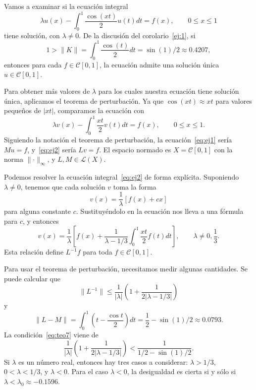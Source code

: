 \begin{ejemplo}
	Vamos a examinar si la ecuación integral
	\begin{equation}\label{eq:ej1}
		\lambda u(x) - \int_{0}^{1} \dfrac{\cos(xt)}{2}u(t)dt = f(x), \qquad 0 \leqslant x \leqslant 1
	\end{equation}
	tiene solución, con $\lambda \neq 0$. De la discusión del corolario~\eqref{ej:1}, si
	\begin{equation}\label{ej:2}
	1 > \lVert K \rVert = \int_{0}^{1}\dfrac{\cos(t)}{2}dt = \sin (1)/2 \approx 0.4207,
	\end{equation}
	entonces para cada $f \in \mathcal{C}[0,1]$, la ecuación admite una solución única $u \in \mathcal{C}[0,1]$.
	
	Para obtener más valores de $\lambda$ para los cuales nuestra ecuación tiene solución única, aplicamos el teorema de perturbación. Ya que $\cos(xt) \approx xt$ para valores pequeños de $|xt|$, comparamos la ecuación con
	\begin{equation}\label{eq:ej2}
		\lambda v(x) - \int_{0}^{1} \dfrac{xt}{2}v(t)dt = f(x), \qquad 0 \leqslant x \leqslant 1.
	\end{equation}
	Siguiendo la notación el teorema de perturbación, la ecuación~\eqref{eq:ej1} sería $Mu = f$, y~\eqref{eq:ej2} sería $Lv = f$. El espacio normado es $X = \mathcal{C}[0,1]$ con la norma $\lVert \cdot \rVert_\infty$, y $L,M \in \mathcal{L}(X)$.
	
	Podemos resolver la ecuación integral~\eqref{eq:ej2} de forma explícita. Suponiendo $\lambda \neq 0$, tenemos que cada solución $v$ toma la forma
	\begin{equation}
		v(x) = \dfrac{1}{\lambda}[f(x)+cx]
	\end{equation}
	para alguna constante $c$. Sustituyéndolo en la ecuación nos lleva a una fórmula para $c$, y entonces
	\begin{equation}
		v(x) = \dfrac{1}{\lambda}[f(x) + \dfrac{1}{\lambda - 1/3}\int_{0}^{1}\dfrac{xt}{2}f(t)dt], \qquad \lambda \neq 0,\dfrac{1}{3}.
	\end{equation}
	Esta relación define $L^{-1}f$ para toda $f \in \mathcal{C}[0,1]$.
	
	Para usar el teorema de perturbación, necesitamos medir algunas cantidades. Se puede calcular que
	\begin{equation}
		\lVert L^{-1} \rVert \leqslant \dfrac{1}{|\lambda|}(1 + \dfrac{1}{2|\lambda - 1/3|})
	\end{equation}
	y
	\begin{equation}
		\lVert L-M \rVert = \int_{0}^{1} (t - \dfrac{\cos t}{2})dt = \dfrac{1}{2} - \sin(1)/2 \approx 0.0793.
	\end{equation}
	La condición~\eqref{eq:teo7} viene de
	\begin{equation}\label{ej:3}
		\dfrac{1}{|\lambda|}(1+\dfrac{1}{2|\lambda - 1/3|}) < \dfrac{1}{1/2 - \sin(1)/2}.
	\end{equation}
	Si $\lambda$ es un número real, entonces hay tres casos a considerar: $\lambda > 1/3$, $0 < \lambda < 1/3$, y $\lambda < 0$. Para el caso $\lambda < 0$, la desigualdad es cierta si y sólo si $\lambda < \lambda_0 \approx -0.1596$.
	

\end{ejemplo}
